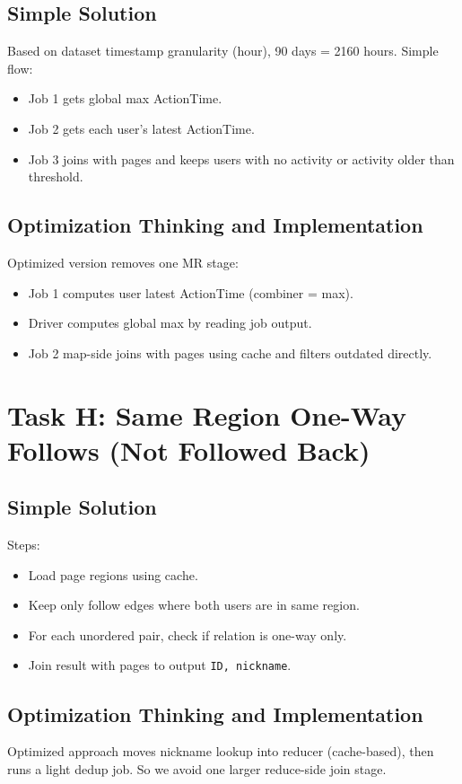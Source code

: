 \documentclass[11pt]{article}
\begin{document}
    \subsection*{Simple Solution}
    Based on dataset timestamp granularity (hour), 90 days = 2160 hours.
    Simple flow:
    \begin{itemize}
        \item Job 1 gets global max ActionTime.
        \item Job 2 gets each user's latest ActionTime.
        \item Job 3 joins with pages and keeps users with no activity or activity older than threshold.
    \end{itemize}

    \subsection*{Optimization Thinking and Implementation}
    Optimized version removes one MR stage:
    \begin{itemize}
        \item Job 1 computes user latest ActionTime (combiner = max).
        \item Driver computes global max by reading job output.
        \item Job 2 map-side joins with pages using cache and filters outdated directly.
    \end{itemize}

    \section{Task H: Same Region One-Way Follows (Not Followed Back)}
    \subsection*{Simple Solution}
    Steps:
    \begin{itemize}
        \item Load page regions using cache.
        \item Keep only follow edges where both users are in same region.
        \item For each unordered pair, check if relation is one-way only.
        \item Join result with pages to output \texttt{ID, nickname}.
    \end{itemize}

    \subsection*{Optimization Thinking and Implementation}
    Optimized approach moves nickname lookup into reducer (cache-based), then runs a light dedup job.
    So we avoid one larger reduce-side join stage.
\end{document}
